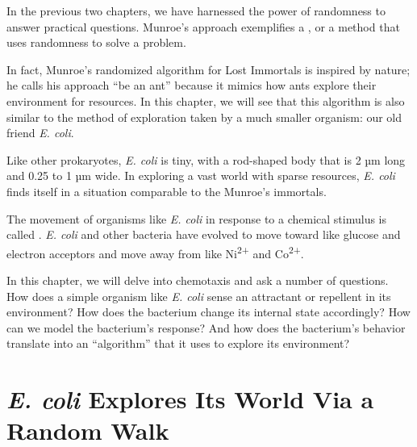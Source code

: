In the previous two chapters, we have harnessed the power of randomness to answer practical questions. Munroe's approach exemplifies a , or a method that uses randomness to solve a problem.

In fact, Munroe's randomized algorithm for Lost Immortals is inspired by nature; he calls his approach ``be an ant'' because it mimics how ants explore their environment for resources. In this chapter, we will see that this algorithm is also similar to the method of exploration taken by a much smaller organism: our old friend \textit{E. coli}.

Like other prokaryotes, \textit{E. coli} is tiny, with a rod-shaped body that is 2 µm long and 0.25 to 1 µm wide. In exploring a vast world with sparse resources, \textit{E. coli} finds itself in a situation comparable to the Munroe's immortals.

%

The movement of organisms like \textit{E. coli} in response to a chemical stimulus is called . \textit{E. coli} and other bacteria have evolved to move toward  like glucose and electron acceptors and move away from  like Ni\textsuperscript{2+} and Co\textsuperscript{2+}.

In this chapter, we will delve into chemotaxis and ask a number of questions. How does a simple organism like \textit{E. coli} sense an attractant or repellent in its environment? How does the bacterium change its internal state accordingly? How can we model the bacterium's response? And how does the bacterium's behavior translate into an ``algorithm'' that it uses to explore its environment?\\

\FloatBarrier
{}
\section{\textit{E. coli} Explores Its World Via a Random Walk}
\label{sec:e_coli_explores_its_world_via_a_random_walk}

